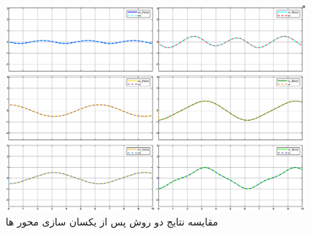 \begin{figure}[htbp]
	\centering
	\includegraphics[width=0.7\linewidth]{"../img/compare plot_after_minus"}
	\caption{مقایسه نتایج دو روش پس از یکسان سازی محور ها}
	\label{fig:compare-plotafterminus}
\end{figure}
\FloatBarrier
